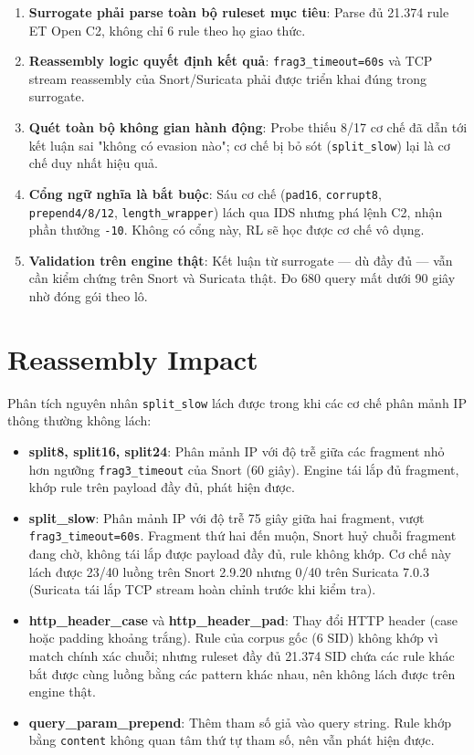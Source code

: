 \documentclass[12pt, a4paper, openany]{book}
\begin{document}
\begin{enumerate}
    \item \textbf{Surrogate phải parse toàn bộ ruleset mục tiêu}: Parse đủ 21.374 rule ET Open C2, không chỉ 6 rule theo họ giao thức.
    \item \textbf{Reassembly logic quyết định kết quả}: \texttt{frag3\_timeout=60s} và TCP stream reassembly của Snort/Suricata phải được triển khai đúng trong surrogate.
    \item \textbf{Quét toàn bộ không gian hành động}: Probe thiếu 8/17 cơ chế đã dẫn tới kết luận sai "không có evasion nào"; cơ chế bị bỏ sót (\texttt{split\_slow}) lại là cơ chế duy nhất hiệu quả.
    \item \textbf{Cổng ngữ nghĩa là bắt buộc}: Sáu cơ chế (\texttt{pad16}, \texttt{corrupt8}, \texttt{prepend4/8/12}, \texttt{length\_wrapper}) lách qua IDS nhưng phá lệnh C2, nhận phần thưởng \texttt{-10}. Không có cổng này, RL sẽ học được cơ chế vô dụng.
    \item \textbf{Validation trên engine thật}: Kết luận từ surrogate — dù đầy đủ — vẫn cần kiểm chứng trên Snort và Suricata thật. Đo 680 query mất dưới 90 giây nhờ đóng gói theo lô.
\end{enumerate}

\section{Reassembly Impact}

Phân tích nguyên nhân \texttt{split\_slow} lách được trong khi các cơ chế phân mảnh IP thông thường không lách:

\begin{itemize}
    \item \textbf{split8, split16, split24}: Phân mảnh IP với độ trễ giữa các fragment nhỏ hơn ngưỡng \texttt{frag3\_timeout} của Snort (60 giây). Engine tái lắp đủ fragment, khớp rule trên payload đầy đủ, phát hiện được.
    \item \textbf{split\_slow}: Phân mảnh IP với độ trễ 75 giây giữa hai fragment, vượt \texttt{frag3\_timeout=60s}. Fragment thứ hai đến muộn, Snort huỷ chuỗi fragment đang chờ, không tái lắp được payload đầy đủ, rule không khớp. Cơ chế này lách được 23/40 luồng trên Snort 2.9.20 nhưng 0/40 trên Suricata 7.0.3 (Suricata tái lắp TCP stream hoàn chỉnh trước khi kiểm tra).
    \item \textbf{http\_header\_case} và \textbf{http\_header\_pad}: Thay đổi HTTP header (case hoặc padding khoảng trắng). Rule của corpus gốc (6 SID) không khớp vì match chính xác chuỗi; nhưng ruleset đầy đủ 21.374 SID chứa các rule khác bắt được cùng luồng bằng các pattern khác nhau, nên không lách được trên engine thật.
    \item \textbf{query\_param\_prepend}: Thêm tham số giả vào query string. Rule khớp bằng \texttt{content} không quan tâm thứ tự tham số, nên vẫn phát hiện được.
\end{itemize}
\end{document}
